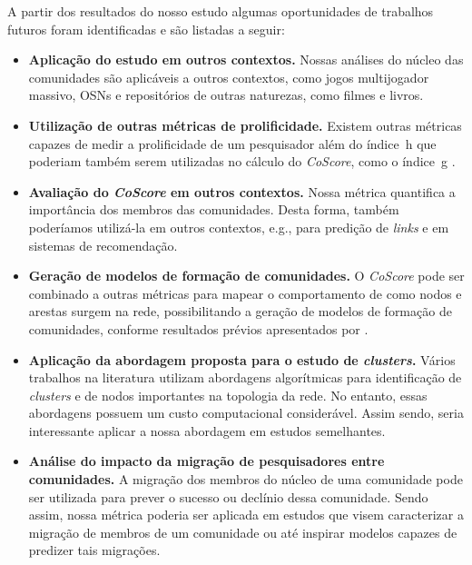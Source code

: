 \documentclass[12pt]{article}
\begin{document}
A partir dos resultados do nosso estudo algumas oportunidades de trabalhos futuros foram identificadas e são listadas a seguir:

\begin{itemize}
  \item \textbf{Aplicação do estudo em outros contextos.} Nossas análises do núcleo das comunidades são aplicáveis a outros 
		contextos, como jogos multijogador massivo, OSNs e repositórios de outras 
		naturezas, como filmes e livros.
  \item \textbf{Utilização de outras métricas de prolificidade.} Existem outras métricas capazes de medir a 
		prolificidade de um pesquisador além do índice~h que poderiam também serem utilizadas no cálculo do 
		\textit{CoScore}, como o índice~g \cite{Egghe2006}.
  \item \textbf{Avaliação do \textit{CoScore} em outros contextos.} Nossa métrica quantifica a importância dos 
	        membros das comunidades. Desta forma, também poderíamos utilizá-la em outros contextos, e.g., para predição 
	        de \textit{links} e em sistemas de recomendação.
  \item \textbf{Geração de modelos de formação de comunidades.} O \textit{CoScore} pode ser combinado a outras
	        métricas para mapear o comportamento de como nodos e arestas surgem na rede, possibilitando a 
	        geração de modelos de formação de comunidades, conforme resultados prévios apresentados por \cite{Leskovec2005, Leskovec2008}.
  \item \textbf{Aplicação da abordagem proposta para o estudo de \textit{clusters}.} Vários trabalhos na literatura utilizam
	        abordagens algorítmicas para identificação de \textit{clusters} e de nodos importantes na topologia da rede. No entanto, 
	        essas abordagens possuem um custo computacional considerável. Assim sendo, seria interessante aplicar a nossa abordagem 
	        em estudos semelhantes.
  \item \textbf{Análise do impacto da migração de pesquisadores entre comunidades.} A migração dos membros do núcleo de uma comunidade
		pode ser utilizada para prever o sucesso ou declínio dessa comunidade. Sendo assim, nossa métrica poderia ser aplicada
		em estudos que visem caracterizar a migração de membros de um comunidade ou até inspirar modelos capazes de predizer tais migrações.
\end{itemize}



\end{document}
